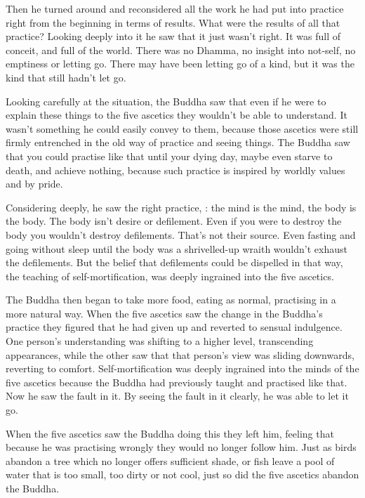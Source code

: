 Then he turned around and reconsidered all the work he had put into practice right from the beginning in terms of results. What were the results of all that practice? Looking deeply into it he saw that it just wasn't right. It was full of conceit, and full of the world. There was no Dhamma, no insight into not-self,  no emptiness or letting go. There may have been letting go of a kind, but it was the kind that still hadn't let go. 

Looking carefully at the situation, the Buddha saw that even if he were to explain these things to the five ascetics they wouldn't be able to understand. It wasn't something he could easily convey to them, because those ascetics were still firmly entrenched in the old way of practice and seeing things. The Buddha saw that you could practise like that until your dying day, maybe even starve to death, and achieve nothing, because such practice is inspired by worldly values and by pride. 

Considering deeply, he saw the right practice, : the mind is the mind, the body is the body. The body isn't desire or defilement. Even if you were to destroy the body you wouldn't destroy defilements. That's not their source. Even fasting and going without sleep until the body was a shrivelled-up wraith wouldn't exhaust the defilements. But the belief that defilements could be dispelled in that way, the teaching of self-mortification, was deeply ingrained into the five ascetics. 

The Buddha then began to take more food, eating as normal, practising in a more natural way. When the five ascetics saw the change in the Buddha's practice they figured that he had given up and reverted to sensual indulgence. One person's understanding was shifting to a higher level, transcending appearances, while the other saw that that person's view was sliding downwards, reverting to comfort. Self-mortification was deeply ingrained into the minds of the five ascetics because the Buddha had previously taught and practised like that. Now he saw the fault in it. By seeing the fault in it clearly, he was able to let it go. 

When the five ascetics saw the Buddha doing this they left him, feeling that because he was practising wrongly they would no longer follow him. Just as birds abandon a tree which no longer offers sufficient shade, or fish leave a pool of water that is too small, too dirty or not cool, just so did the five ascetics abandon the Buddha. 

